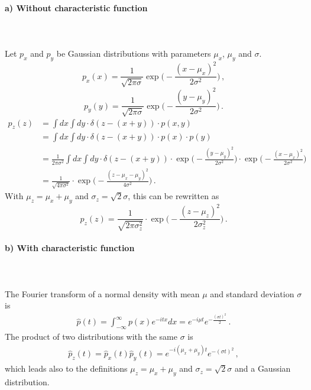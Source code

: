 \paragraph{a) Without characteristic function} \ \\ 
\\
Let $p_x$ and $p_y$ be Gaussian distributions with 
parameters $\mu_x$, $\mu_y$ and $\sigma$.
\begin{equation}
    p_x(x)=\frac{1}{\sqrt{2\pi\sigma}}
    \exp\bigg(-\frac{(x-\mu_x)^2}{2\sigma^2}\bigg) \,,
\end{equation}
\begin{equation}
    p_y(y)=\frac{1}{\sqrt{2\pi\sigma}}
    \exp\bigg(-\frac{(y-\mu_y)^2}{2\sigma^2}\bigg) \,.
\end{equation}
\begin{align}
    p_z(z)
    &=\int dx\int dy\cdot\delta(z-(x+y))\cdot p(x,y) \\
    &=\int dx\int dy\cdot\delta(z-(x+y))\cdot p(x)\cdot p(y) \\
    &=\frac{1}{2\pi\sigma^2}\int dx\int dy\cdot
    \delta(z-(x+y))\cdot
    \exp\bigg(-\frac{(y-\mu_y)^2}{2\sigma^2}\bigg)\cdot
    \exp\bigg(-\frac{(x-\mu_x)^2}{2\sigma^2}\bigg) \\
    &=\frac{1}{\sqrt{4\pi\sigma^2}}\cdot
    \exp\bigg(-\frac{(z-\mu_x-\mu_y)^2}{4\sigma^2}\bigg) \,.
\end{align}
With $\mu_z=\mu_x+\mu_y$
and $\sigma_z=\sqrt{2} \sigma$, this can be 
rewritten as
\begin{equation}
    p_z(z)
    =\frac{1}{\sqrt{2\pi\sigma_z^2}}\cdot
    \exp\bigg(-\frac{(z-\mu_z)^2}{2\sigma_z^2}\bigg) \,.
\end{equation}

\paragraph{b) With characteristic function} \ \\
\\
The Fourier transform of a normal density with mean $\mu$ and standard deviation $\sigma$ is
\begin{align}
\hat{p}(t) = \int_{-\infty}^{\infty} p(x) e^{-itx} dx = e^{-i\mu t} e^{-\frac{(\sigma t)^2}{2}} \,.
\end{align}
The product of two distributions with the same $\sigma$ is
\begin{align}
\hat{p}_z(t) = \hat{p}_x(t)\hat{p}_y(t) = e^{-i(\mu_x+\mu_y) t} e^{-(\sigma t)^2} \,,
\end{align}
which leads also to the definitions $\mu_z=\mu_x+\mu_y$
and $\sigma_z=\sqrt{2} \sigma$ and a Gaussian distribution.